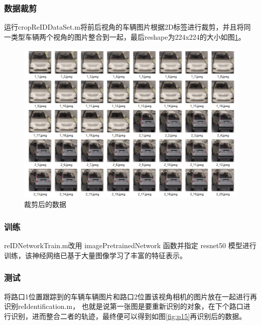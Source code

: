\subsubsection{数据裁剪}
运行cropReIDDataSet.m将前后视角的车辆图片根据2D标签进行裁剪，并且将同一类型车辆两个视角的图片整合到一起，最后reshape为224x224的大小如图\ref{fig:p14}。



\begin{figure}[htbp] %
	\centering
	\includegraphics[width=1\textwidth]{p14} %
	\caption{裁剪后的数据} %
	\label{fig:p14} %
\end{figure}




\subsubsection{训练}
reIDNetworkTrain.m改用 imagePretrainedNetwork 函数并指定 resnet50 模型进行训练，该神经网络已基于大量图像学习了丰富的特征表示。
\subsubsection{测试}
将路口1位置跟踪到的车辆车辆图片和路口2位置该视角相机的图片放在一起进行再识别reIdentification.m， 也就是说第一张图是要重新识别的对象，在下个路口进行识别，进而整合二者的轨迹，最终便可以得到如图\ref{fig:p15}再识别后的数据。







